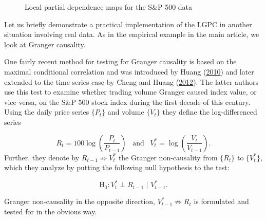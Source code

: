 \documentclass[
  12pt,
  letterpaper]{article}
\numberwithin{equation}{section}
\begin{document}
\begin{figure}
\caption{Local partial dependence maps for the S\&P 500 data}\label{fig:realplots}
\end{figure}

Let us briefly demonstrate a practical implementation of the LGPC in another situation involving real data. As in the empirical example in the main article, we look at Granger causality.

One fairly recent method for testing for Granger causality is based on the maximal conditional correlation and was introduced by Huang (\protect\hyperlink{ref-huang2010testing}{2010}) and later extended to the time series case by Cheng and Huang (\protect\hyperlink{ref-cheng2012conditional}{2012}). The latter authors use this test to examine whether trading volume Granger caused index value, or vice versa, on the S\&P 500 stock index during the first decade of this century. Using the daily price series \(\{P_t\}\) and volume \(\{V_t\}\) they define the log-differenced series

\[R_t = 100\log\left(\frac{P_t}{P_{t-1}}\right) \,\,\, \textrm{ and } \,\,\, V_t^* = \log\left(\frac{V_t}{V_{t-1}}\right).\]
Further, they denote by \(R_{t-1} \not\Rightarrow V_t^*\) the Granger non-causality from \(\{R_t\}\) to \(\{V_t^*\}\), which they analyze by putting the following null hypothesis to the test:

\begin{equation}
\textrm{H}_0: V_t^* \perp R_{t-1} \,\, | \,\, V_{t-1}^*.
\label{eq:grangernull500}
\end{equation}

Granger non-causality in the opposite direction, \(V_{t-1}^* \not\Rightarrow R_t\) is formulated and tested for in the obvious way.
\end{document}
